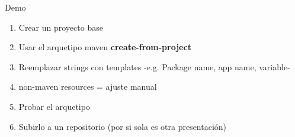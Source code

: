 \documentclass[aspectratio=169]{beamer}
\begin{document}
\begin{frame}{Demo}

        \begin{enumerate}
           \item Crear un proyecto base
           \item Usar el arquetipo maven \textbf{create-from-project}
           \item Reemplazar strings con templates -e.g. Package name, app name, variable-
           \item non-maven resources = ajuste manual
           \item Probar el arquetipo
           \item Subirlo a un repositorio (por si sola es otra presentación)
        \end{enumerate}

\end{frame}
\end{document}
